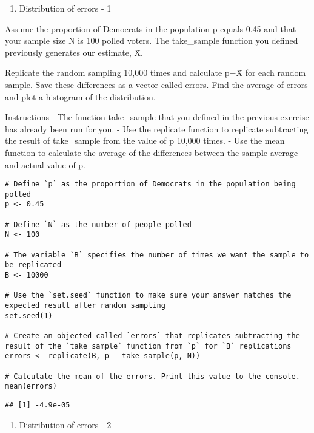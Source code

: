 \documentclass[
]{article}
\providecommand{\tightlist}{%
  \setlength{\itemsep}{0pt}\setlength{\parskip}{0pt}}
\begin{document}
\begin{enumerate}
\def\labelenumi{\arabic{enumi}.}
\setcounter{enumi}{1}
\tightlist
\item
  Distribution of errors - 1
\end{enumerate}

Assume the proportion of Democrats in the population p equals 0.45 and
that your sample size N is 100 polled voters. The take\_sample function
you defined previously generates our estimate, X̄.

Replicate the random sampling 10,000 times and calculate p−X̄ for each
random sample. Save these differences as a vector called errors. Find
the average of errors and plot a histogram of the distribution.

Instructions - The function take\_sample that you defined in the
previous exercise has already been run for you. - Use the replicate
function to replicate subtracting the result of take\_sample from the
value of p 10,000 times. - Use the mean function to calculate the
average of the differences between the sample average and actual value
of p.~

\begin{verbatim}
# Define `p` as the proportion of Democrats in the population being polled
p <- 0.45

# Define `N` as the number of people polled
N <- 100

# The variable `B` specifies the number of times we want the sample to be replicated
B <- 10000

# Use the `set.seed` function to make sure your answer matches the expected result after random sampling
set.seed(1)

# Create an objected called `errors` that replicates subtracting the result of the `take_sample` function from `p` for `B` replications
errors <- replicate(B, p - take_sample(p, N))

# Calculate the mean of the errors. Print this value to the console.
mean(errors)
\end{verbatim}

\begin{verbatim}
## [1] -4.9e-05
\end{verbatim}

\begin{enumerate}
\def\labelenumi{\arabic{enumi}.}
\setcounter{enumi}{2}
\tightlist
\item
  Distribution of errors - 2
\end{enumerate}
\end{document}
